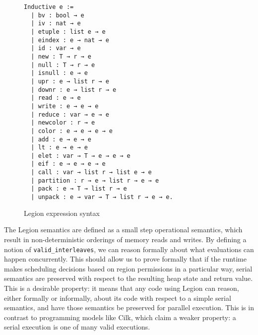 \documentclass[sigconf]{acmart}
\begin{document}
\begin{figure}
\centering
\begin{BVerbatim}
Inductive e :=
  | bv : bool → e
  | iv : nat → e
  | etuple : list e → e
  | eindex : e → nat → e
  | id : var → e
  | new : T → r → e
  | null : T → r → e
  | isnull : e → e
  | upr : e → list r → e
  | downr : e → list r → e
  | read : e → e 
  | write : e → e → e
  | reduce : var → e → e
  | newcolor : r → e
  | color : e → e → e → e
  | add : e → e → e
  | lt : e → e → e
  | elet : var → T → e → e → e
  | eif : e → e → e → e
  | call : var → list r → list e → e
  | partition : r → e → list r → e → e
  | pack : e → T → list r → e
  | unpack : e → var → T → list r → e → e.
\end{BVerbatim}
\caption{Legion expression syntax}
\label{syntax}
\end{figure}

The Legion semantics are defined as a small step operational semantics, which
result in non-deterministic orderings of memory reads and writes. By defining a
notion of \texttt{valid\_interleaves}, we can reason formally about what evaluations 
can happen concurrently. This should allow us to prove formally that if the
runtime makes scheduling decisions based on region permissions in a particular
way, serial semantics are preserved with respect to the resulting heap state
and return value. This is a desirable property: it means that any code using
Legion can reason, either formally or informally, about its code with respect
to a simple serial semantics, and have those semantics be preserved for
parallel execution. This is in contrast to programming models like Cilk, which
claim a weaker property: a serial execution is one of many valid executions. 
\end{document}

